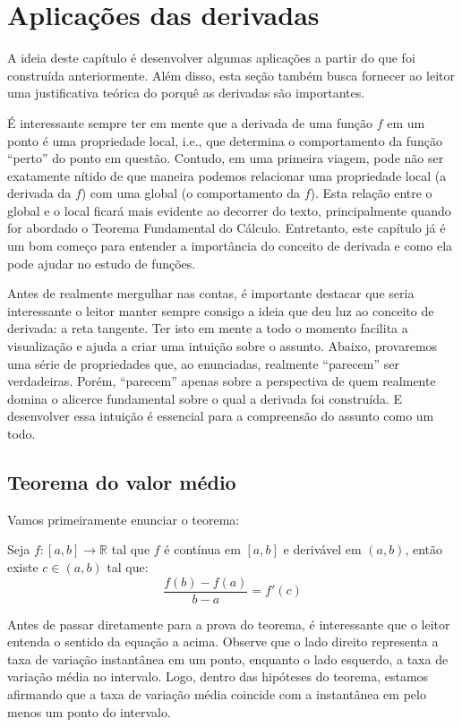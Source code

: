 
\chapter{Aplicações das derivadas}\label{cap:apl_derivadas}

\emconstrucao

	A ideia deste capítulo é desenvolver algumas aplicações a partir do que foi construída anteriormente. Além disso, esta seção também busca fornecer ao leitor uma justificativa teórica do porquê as derivadas são importantes. 

	É interessante sempre ter em mente que a derivada de uma função $f$ em um ponto é uma propriedade local, i.e., que determina o comportamento da função ``perto'' do ponto em questão. Contudo, em uma primeira viagem, pode não ser exatamente nítido de que maneira podemos relacionar uma propriedade local (a derivada da $f$) com uma global (o comportamento da $f$). Esta relação entre o global e o local ficará mais evidente ao decorrer do texto, principalmente quando for abordado o Teorema Fundamental do Cálculo. Entretanto, este capítulo já é um bom começo para entender a importância do conceito de derivada e como ela pode ajudar no estudo de funções.
	
	Antes de realmente mergulhar nas contas, é importante destacar que seria interessante o leitor manter sempre consigo a ideia que deu luz ao conceito de derivada: a reta tangente. Ter isto em mente a todo o momento facilita a visualização e ajuda a criar uma intuição sobre o assunto. Abaixo, provaremos uma série de propriedades que, ao enunciadas, realmente ``parecem'' ser verdadeiras. Porém, ``parecem'' apenas sobre a perspectiva de quem realmente domina o alicerce fundamental sobre o qual a derivada foi construída. E desenvolver essa intuição é essencial para a compreensão do assunto como um todo.
 
\section{Teorema do valor médio}
\construirSec
Vamos primeiramente enunciar o teorema:
	\begin{teo}
		Seja $f:[a,b]\to \mathbb{R}$ tal que $f$ é contínua em $[a,b]$ e derivável em $(a,b)$, então existe $c \in (a,b)$ tal que:
		$$\frac{f(b) - f(a)}{b - a} = f'(c)$$
	\end{teo}
	Antes de passar diretamente para a prova do teorema, é interessante que o leitor entenda o sentido da equação a acima. Observe que o lado direito representa a taxa de variação instantânea em um ponto, enquanto o lado esquerdo, a taxa de variação média no intervalo. Logo, dentro das hipóteses do teorema, estamos afirmando que a taxa de variação média coincide com a instantânea em pelo menos um ponto do intervalo. 
	
